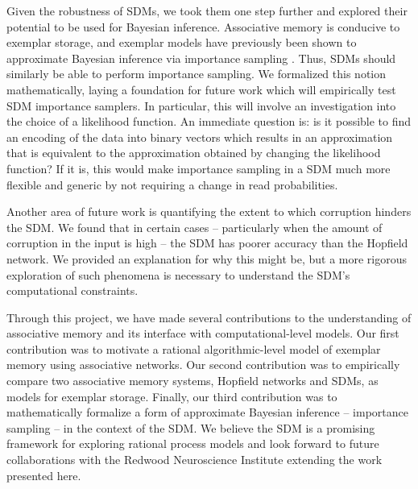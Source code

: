 \documentclass[10pt,letterpaper]{article}
\begin{document}
Given the robustness of SDMs, we took them one step further and
explored their potential to be used for Bayesian
inference. Associative memory is conducive to exemplar storage, and
exemplar models have previously been shown to approximate Bayesian
inference via importance sampling \cite{Shi2010}. Thus, SDMs should
similarly be able to perform importance sampling. We formalized this
notion mathematically, laying a foundation for future work which will
empirically test SDM importance samplers. In particular, this will
involve an investigation into the choice of a likelihood function. An
immediate question is: is it possible to find an encoding of the data
into binary vectors which results in an approximation that is
equivalent to the approximation obtained by changing the likelihood
function? If it is, this would make importance sampling in a SDM much
more flexible and generic by not requiring a change in read
probabilities.

Another area of future work is quantifying the extent to which
corruption hinders the SDM. We found that in certain cases --
particularly when the amount of corruption in the input is high -- the
SDM has poorer accuracy than the Hopfield network. We provided an
explanation for why this might be, but a more rigorous exploration of
such phenomena is necessary to understand the SDM's computational
constraints.

Through this project, we have made several contributions to the
understanding of associative memory and its interface with
computational-level models. Our first contribution was to motivate a
rational algorithmic-level model of exemplar memory using associative
networks. Our second contribution was to empirically compare two
associative memory systems, Hopfield networks and SDMs, as models for
exemplar storage. Finally, our third contribution was to
mathematically formalize a form of approximate Bayesian inference --
importance sampling -- in the context of the SDM. We believe the SDM
is a promising framework for exploring rational process models and
look forward to future collaborations with the Redwood Neuroscience
Institute extending the work presented here.




\setlength{\bibleftmargin}{.125in}
\setlength{\bibindent}{-\bibleftmargin}





\end{document}
